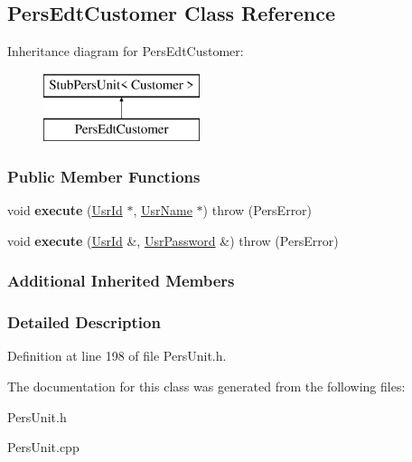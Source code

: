 \hypertarget{classPersEdtCustomer}{\subsection{Pers\-Edt\-Customer Class Reference}
\label{de/d6a/classPersEdtCustomer}
}
Inheritance diagram for Pers\-Edt\-Customer\-:\begin{figure}[H]
\begin{center}
\leavevmode
\includegraphics[height=2.000000cm]{de/d6a/classPersEdtCustomer}
\end{center}
\end{figure}
\subsubsection*{Public Member Functions}
\begin{DoxyCompactItemize}
\item 
\hypertarget{classPersEdtCustomer_a5275d925c901c95fbeb2036cd5c8e91e}{void {\bfseries execute} (\hyperlink{classUsrId}{Usr\-Id} $\ast$, \hyperlink{classUsrName}{Usr\-Name} $\ast$)  throw (\-Pers\-Error)}\label{de/d6a/classPersEdtCustomer_a5275d925c901c95fbeb2036cd5c8e91e}

\item 
\hypertarget{classPersEdtCustomer_a317d8e46e20e7bf342125dc6fda3adb9}{void {\bfseries execute} (\hyperlink{classUsrId}{Usr\-Id} \&, \hyperlink{classUsrPassword}{Usr\-Password} \&)  throw (\-Pers\-Error)}\label{de/d6a/classPersEdtCustomer_a317d8e46e20e7bf342125dc6fda3adb9}

\end{DoxyCompactItemize}
\subsubsection*{Additional Inherited Members}


\subsubsection{Detailed Description}


Definition at line 198 of file Pers\-Unit.\-h.



The documentation for this class was generated from the following files\-:\begin{DoxyCompactItemize}
\item 
Pers\-Unit.\-h\item 
Pers\-Unit.\-cpp\end{DoxyCompactItemize}
